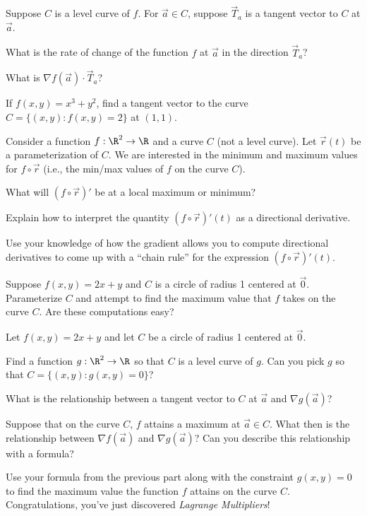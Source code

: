 \begin{question}
	Suppose $C$ is a level curve of $f$.  For $\vec a\in C$, suppose $\vec T_a$ is a tangent vector to
	$C$ at $\vec a$.
	\begin{parts}
		\item What is the rate of change of the function $f$ at $\vec a$ in the direction $\vec T_a$?
		\item What is $\nabla f(\vec a)\cdot \vec T_a$?
		\item If $f(x,y)=x^3+y^2$, find a tangent vector to the curve $C=\{(x,y):f(x,y)=2\}$ at $(1,1)$.
	\end{parts}
\end{question}

\begin{question}
	Consider a function $f:\R^2\to \R$ and a curve $C$ (not a level curve).  Let $\vec r(t)$
	be a parameterization of $C$.  We are interested in the minimum and maximum values for 
	$f\circ \vec r$ (i.e., the min/max values of $f$ on the curve $C$).
	\begin{parts}
		\item What will $(f\circ \vec r)'$ be at a local maximum or minimum?
		\item Explain how to interpret the quantity $(f\circ \vec r)'(t)$
			as a directional derivative.
		\item Use your knowledge of how the gradient allows you to compute directional derivatives
			to come up with a ``chain rule'' for the expression $(f\circ \vec r)'(t)$.
		\item Suppose $f(x,y) = 2x+y$ and $C$ is a circle of radius 1 centered at $\vec 0$.
			Parameterize $C$ and attempt to find the maximum value that $f$ takes on the curve $C$.
			Are these computations easy?
	\end{parts}
\end{question}

\begin{question}
	Let $f(x,y)=2x+y$ and let $C$ be a circle of radius 1 centered at $\vec 0$.
	\begin{parts}
		\item Find a function $g:\R^2\to \R$ so that $C$ is a level curve of $g$.
			Can you pick $g$ so that $C=\{(x,y): g(x,y)=0\}$?
		\item What is the relationship between a tangent vector to $C$ at $\vec a$ and
			$\nabla g(\vec a)$?
		\item Suppose that on the curve $C$, $f$ attains 
			a maximum at $\vec a\in C$. What then is the relationship between 
			$\nabla f(\vec a)$ and $\nabla g(\vec a)$?  Can you describe this relationship
			with a formula?
		\item Use your formula from the previous part along with the constraint $g(x,y)=0$
			to find the maximum value the function $f$ attains on the curve $C$.  Congratulations,
			you've just discovered \emph{Lagrange Multipliers}!

	\end{parts}
\end{question}

